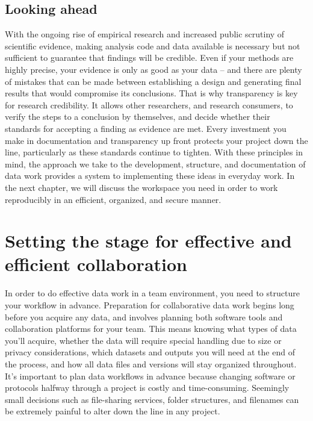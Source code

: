 \documentclass[
]{book}
\begin{document}
\hypertarget{looking-ahead-1}{%
\section*{Looking ahead}\label{looking-ahead-1}}

With the ongoing rise of empirical research and increased public scrutiny of scientific evidence,
making analysis code and data available
is necessary but not sufficient to guarantee that findings will be credible.
Even if your methods are highly precise,
your evidence is only as good as your data --
and there are plenty of mistakes that can be made between
establishing a design and generating final results that would compromise its conclusions.
That is why transparency is key for research credibility.
It allows other researchers, and research consumers,
to verify the steps to a conclusion by themselves,
and decide whether their standards for accepting a finding as evidence are met.
Every investment you make in documentation and transparency up front
protects your project down the line, particularly as these standards continue to tighten.
With these principles in mind,
the approach we take to the development, structure,
and documentation of data work
provides a system to implementing these ideas in everyday work.
In the next chapter, we will discuss the workspace you need
in order to work reproducibly in an efficient, organized, and secure manner.

\hypertarget{collaboration}{%
\chapter{Setting the stage for effective and efficient collaboration}\label{collaboration}}

In order to do effective data work in a team environment,
you need to structure your workflow in advance.
Preparation for collaborative data work begins long before you acquire any data,
and involves planning both software tools and collaboration platforms for your team.
This means knowing what types of data you'll acquire,
whether the data will require special handling due to size or privacy considerations,
which datasets and outputs you will need at the end of the process,
and how all data files and versions will stay organized throughout.
It's important to plan data workflows in advance because
changing software or protocols halfway through a project is costly and time-consuming.
Seemingly small decisions such as file-sharing services, folder structures,
and filenames can be extremely painful to alter down the line in any project.
\end{document}
